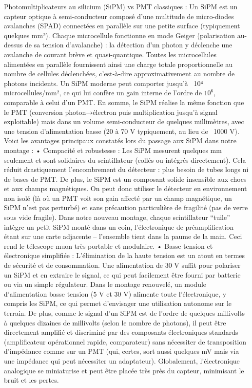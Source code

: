 \documentclass[a4paper,12pt,twoside]{article}
\begin{document}
Photomultiplicateurs au silicium (SiPM) vs PMT classiques : Un SiPM est un capteur optique à semi-conducteur composé d’une multitude de micro-diodes avalanches (SPAD) connectées en parallèle sur une petite surface (typiquement quelques mm²). Chaque microcellule fonctionne en mode Geiger (polarisation au-dessus de sa tension d’avalanche) : la détection d’un photon y déclenche une avalanche de courant brève et quasi-quantique. Toutes les microcellules alimentées en parallèle fournissent ainsi une charge totale proportionnelle au nombre de cellules déclenchées, c’est-à-dire approximativement au nombre de photons incidents. Un SiPM moderne peut comporter jusqu’à ~10⁴ microcellules/mm², ce qui lui confère un gain interne de l’ordre de $10^6$, comparable à celui d’un PMT. En somme, le SiPM réalise la même fonction que le PMT (conversion photon→électron puis multiplication jusqu’à signal exploitable) mais dans un volume semi-conducteur de quelques millimètres, avec une tension d’alimentation basse (20 à 70 V typiquement, au lieu de ~1000 V). Voici les avantages principaux constatés lors du passage aux SiPM dans notre montage :
	•	Compacité et robustesse : Les SiPM mesurent quelques mm seulement et sont solidaires du scintillateur (collés ou intégrés directement). Cela réduit drastiquement l’encombrement du détecteur : plus besoin de tubes longs ni de bases de PMT. De plus, le SiPM est un composant solide insensible aux chocs et aux champs magnétiques. On peut donc utiliser le détecteur en environnement non isolé (là où un PMT voit son gain affecté par un champ magnétique, un SiPM n’est pas perturbé) et sans précaution particulière de fragilité (pas de verre sous vide fragile). Dans notre nouveau montage, chaque scintillateur “tuile” intègre un petit SiPM monté dans un coin, l’électronique de préamplification étant sur une carte adjacente – l’ensemble tient dans la paume de la main. Ceci rend le télescope muon très portable et modulaire.
	•	Basse tension et électronique simplifiée : L’élimination de la haute tension est un atout en termes de sécurité et de consommation. Une alimentation de 30 V suffit pour polariser un SiPM et en extraire le signal, ce qui peut facilement être fourni par batterie ou via un simple régulateur. Dans le montage renouvelé, un module d’alimentation basse tension (5 V et 30 V) alimente toute l’électronique, y compris les SiPM, ce qui permet d’envisager une utilisation autonome sur le terrain. De plus, comme le signal d’un SiPM est de l’ordre de quelques millivolts à quelques dizaines de millivolts (selon le nombre de photons), il peut être directement amplifié et discriminé par des composants électroniques standards (amplificateur opérationnel rapide, comparateur) sans nécessiter de transposition d’impédance comme sur un PMT (qui, certes, sort aussi quelques mV mais via une impédance qui peut nécessiter un adaptateur). Globalement, l’électronique analogique se miniaturise et peut être placée très près du capteur, minimisant le bruit et les pertes.
\end{document}
